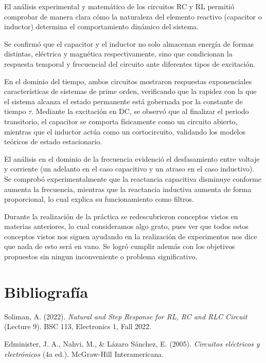 \documentclass[letter,11pt]{article}
\begin{document}
	\hspace{0.5cm}El análisis experimental y matemático de los circuitos RC y RL permitió comprobar de manera clara cómo la naturaleza del elemento reactivo (capacitor o inductor) determina el comportamiento dinámico del sistema. 
	
	\hspace{0.5cm}Se confirmó que el capacitor y el inductor no solo almacenan energía de formas distintas, eléctrica y magnética respectivamente, sino que condicionan la respuesta temporal y frecuencial del circuito ante diferentes tipos de excitación.
	
	\hspace{0.5cm}En el dominio del tiempo, ambos circuitos mostraron respuestas exponenciales características de sistemas de prime orden, verificando que la rapidez con la que el sistema alcanza el estado permanente está gobernada por la constante de tiempo $\tau$. 
	Mediante la excitación en DC, se observó que al finalizar el periodo transitorio, el capacitor se comporta físicamente como un circuito abierto, mientras que el inductor actúa como un cortocircuito, validando los modelos teóricos de estado estacionario.
	
	\hspace{0.5cm}El análisis en el dominio de la frecuencia evidenció el desfasamiento entre voltaje y corriente (un adelanto en el caso capacitivo y un atraso en el caso inductivo). 
	Se comprobó experimentalmente que la reactancia capacitiva disminuye conforme aumenta la frecuencia, mientras que la reactancia inductiva aumenta de forma proporcional, lo cual explica su funcionamiento como filtros.
	
	\hspace{0.5cm}Durante la realización de la práctica se redescubrieron conceptos vistos en materias anteriores, lo cual consideramos algo grato, pues ver que todos estos conceptos vistos nos siguen ayudando en la realización de experimentos nos dice que nada de esto será en vano. 
	Se logró cumplir además con los objetivos propuestos sin ningun inconveniente o problema significativo. 
	
\section{Bibliografía}

	\hspace{0.5cm}Soliman, A. (2022). \textit{Natural and Step Response for RL, RC and RLC Circuit} (Lecture 9). BSC 113, Electronics 1, Fall 2022.
	
	\vspace{5pt}
	\hspace{0.5cm}Edminister, J. A., Nahvi, M., \& Lázaro Sánchez, E. (2005). \textit{Circuitos eléctricos y electrónicos} (4a ed.). McGraw-Hill Interamericana.
	
\end{document}
